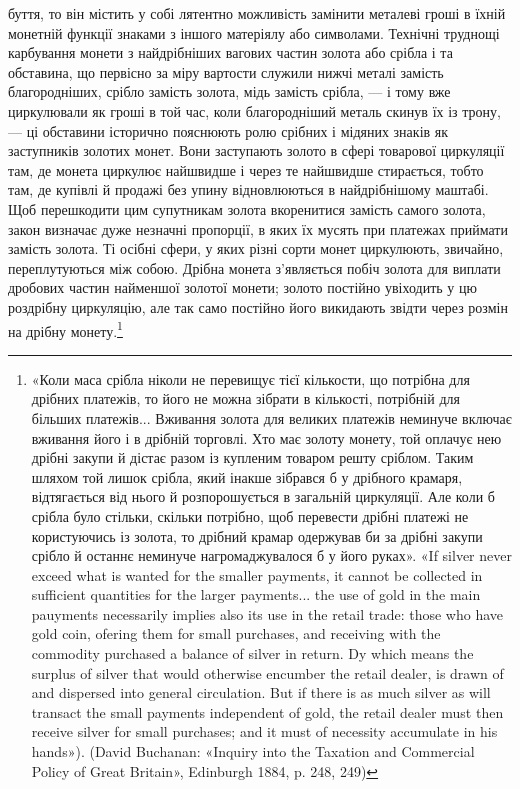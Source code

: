 буття, то він містить у собі лятентно можливість замінити металеві
гроші в їхній монетній функції знаками з іншого матеріялу або
символами. Технічні труднощі карбування монети з найдрібніших
вагових частин золота або срібла і та обставина, що первісно
за міру вартости служили нижчі металі замість благородніших,
срібло замість золота, мідь замість срібла, — і тому вже циркулювали
як гроші в той час, коли благородніший металь скинув
їх із трону, — ці обставини історично пояснюють ролю срібних
і мідяних знаків як заступників золотих монет. Вони заступають
золото в сфері товарової циркуляції там, де монета циркулює
найшвидше і через те найшвидше стирається, тобто там, де купівлі
й продажі без упину відновлюються в найдрібнішому
маштабі. Щоб перешкодити цим супутникам золота вкоренитися
замість самого золота, закон визначає дуже незначні пропорції,
в яких їх мусять при платежах приймати замість золота. Ті осібні
сфери, у яких різні сорти монет циркулюють, звичайно, переплутуються
між собою. Дрібна монета з’являється побіч золота
для виплати дробових частин найменшої золотої монети; золото
постійно увіходить у цю роздрібну циркуляцію, але так само
постійно його викидають звідти через розмін на дрібну монету.\footnote{
«Коли маса срібла ніколи не перевищує тієї кількости, що потрібна
для дрібних платежів, то його не можна зібрати в кількості, потрібній
для більших платежів... Вживання золота для великих платежів неминуче
включає вживання його і в дрібній торговлі. Хто має золоту монету, той
оплачує нею дрібні закупи й дістає разом із купленим товаром решту
сріблом. Таким шляхом той лишок срібла, який інакше зібрався б у дрібного
крамаря, відтягається від нього й розпорошується в загальній циркуляції.
Але коли б срібла було стільки, скільки потрібно, щоб перевести
дрібні платежі не користуючись із золота, то дрібний крамар одержував
би за дрібні закупи срібло й останнє неминуче нагромаджувалося б у
його руках». «If silver never exceed what is wanted for the smaller payments,
it cannot be collected in sufficient quantities for the larger payments...
the use of gold in the main pauyments necessarily implies also
its use in the retail trade: those who have gold coin, ofering them for small
purchases, and receiving with the commodity purchased a balance of silver
in return. Dy which means the surplus of silver that would otherwise encumber
the retail dealer, is drawn of and dispersed into general circulation.
But if there is as much silver as will transact the small payments independent
of gold, the retail dealer must then receive silver for small purchases; and
it must of necessity accumulate in his hands»). (David Buchanan: «Inquiry
into the Taxation and Commercial Policy of Great Britain», Edinburgh
1884, p. 248, 249)
}

